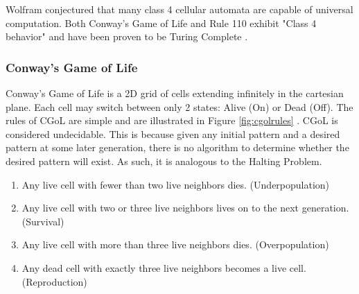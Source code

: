 Wolfram conjectured that many class 4 cellular automata are capable of universal computation.
Both Conway's Game of Life and Rule 110 exhibit "Class 4 behavior" and have been proven to be Turing Complete \cite{CGoLTM,CellAutBook}.

\subsubsection{Conway's Game of Life}\label{subsubsec:CGoL}

Conway's Game of Life is a 2D grid of cells extending infinitely in the cartesian plane.
Each cell may switch between only 2 states: Alive (On) or Dead (Off).
The rules of CGoL are simple and are illustrated in Figure \ref{fig:cgolrules} \cite{CGoLImg}.
CGoL is considered undecidable.
This is because given any initial pattern and a desired pattern at some later generation, there is no algorithm to determine whether the desired pattern will exist.
As such, it is analogous to the Halting Problem.

\begin{enumerate}
    \item Any live cell with fewer than two live neighbors dies. (Underpopulation)
    \item Any live cell with two or three live neighbors lives on to the next generation. (Survival)
    \item Any live cell with more than three live neighbors dies. (Overpopulation)
    \item Any dead cell with exactly three live neighbors becomes a live cell. (Reproduction)
\end{enumerate}


